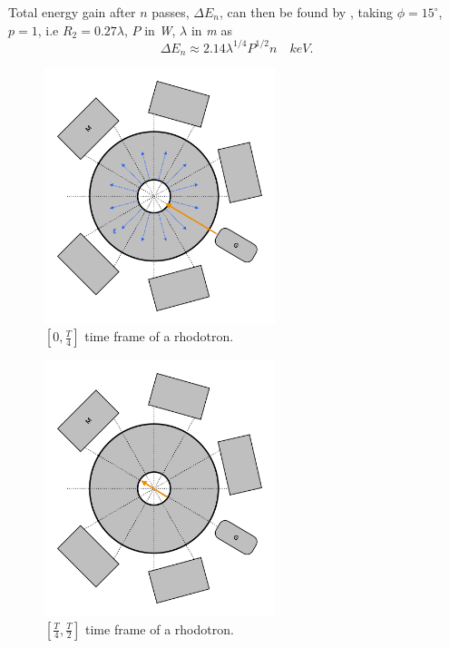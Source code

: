 \documentclass[a4paper,oneside,12pt]{report}
\numberwithin{equation}{chapter}
\begin{document}
\vspace{-15pt}
Total energy gain after $n$ passes, $\Delta E_n$, can then be found by , taking $\phi = 15^\circ$, $p=1$, i.e $R_2 = 0.27 \lambda$, $P$ in \textit{W}, $\lambda$ in \textit{m} as
\vspace{-20pt}
\begin{equation}
    \label{eq:W_total_gain_pottier}
    \Delta E_n \approx 2.14 \lambda^{1/4} P^{1/2} n \quad keV .
\end{equation}

\vspace{-15pt}
\begin{figure}[H]
    \centering
    \includegraphics[width=0.6\textwidth]{./figures/illustrations/rhod1.pdf}
    \caption{$[0, \frac{T}{4}]$ time frame of a rhodotron.}
    \label{fig:rhod_cycle_1}
\end{figure}
\begin{figure}[!th]
    \centering
    \includegraphics[width=0.6\textwidth]{./figures/illustrations/rhod2.pdf}
    \caption{$[\frac{T}{4}, \frac{T}{2}]$ time frame of a rhodotron.}
    \label{fig:rhod_cycle_2}
\end{figure}
\end{document}
